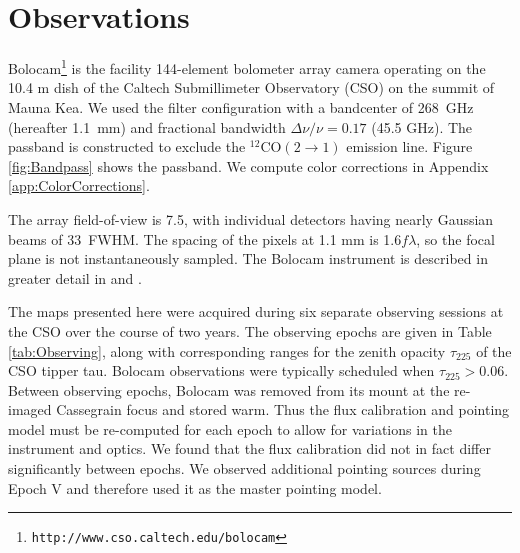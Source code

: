 \documentclass{emulateapj}
\newcommand{\bcamfwhm}{33\arcsec}
\begin{document}
\section{Observations}
\label{sec:Observations}

Bolocam\footnote{{\tt http://www.cso.caltech.edu/bolocam}} is the
facility 144-element bolometer array camera operating on the 10.4 m
dish of the Caltech Submillimeter Observatory (CSO) on the summit of
Mauna Kea.  We used the filter configuration with a bandcenter of
268~GHz (hereafter 1.1~mm) and fractional bandwidth $\Delta \nu/\nu =
0.17$ (45.5 GHz).  The passband is constructed to exclude the
$^{12}\mathrm{CO}(2 \to 1)$ emission line.  Figure \ref{fig:Bandpass}
shows the passband.  We compute color corrections in Appendix
\ref{app:ColorCorrections}.

The array field-of-view is 7\arcmin.5, with individual detectors
having nearly Gaussian beams of \bcamfwhm\ FWHM.  The spacing of the
pixels at 1.1 mm is 1.6$f\lambda$, so the focal plane is not
instantaneously sampled.  The Bolocam instrument is described in
greater detail in \citet{haig04} and \citet{glenn03}.


The maps presented here were acquired during six separate observing
sessions at the CSO over the course of two years.  The observing
epochs are given in Table \ref{tab:Observing}, along with
corresponding ranges for the zenith opacity $\tau_{225}$ of the CSO
tipper tau.  Bolocam observations were typically scheduled when
$\tau_{225} > 0.06$.  Between observing epochs, Bolocam was removed
from its mount at the re-imaged Cassegrain focus and stored warm.
Thus the flux calibration and pointing model must be re-computed for
each epoch to allow for variations in the instrument and optics.  We
found that the flux calibration did not in fact differ significantly
between epochs.  We observed additional pointing sources during Epoch
V and therefore used it as the master pointing model.



\end{document}

